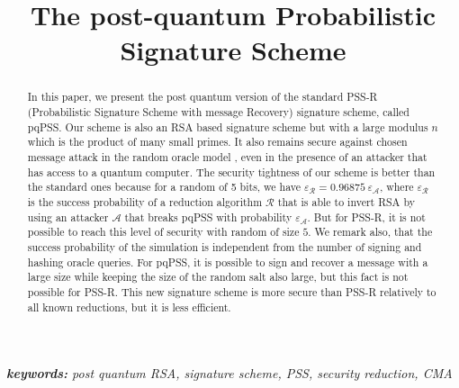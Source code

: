 \documentclass[a4paper,11pt]{article}
\begin{document}
\title{The post-quantum Probabilistic Signature Scheme}
\maketitle
\begin{abstract}
In this paper, we present the post quantum version of the standard PSS-R (Probabilistic Signature Scheme with message Recovery) signature scheme, called pqPSS. Our scheme is also an RSA based signature scheme but with a large modulus $n$ which is the product of many small primes. It also remains secure against chosen message attack in the random oracle model , even in the presence of an attacker that has access to a quantum computer. The security tightness of our scheme is better than the standard ones because for a random of 5 bits, we have $\varepsilon_{\mathcal{R}}=0.96875 \ \varepsilon_{\mathcal{A}}$, where $\varepsilon_{\mathcal{R}}$  is the success probability of a reduction algorithm $\mathcal{R}$ that is able to invert RSA by using an attacker $\mathcal{A}$ that breaks pqPSS with probability $\varepsilon_{\mathcal{A}}$. But for PSS-R, it is not possible to reach this level of security with random of size $5$. We remark also, that the success probability of the simulation is independent from the number of signing and hashing oracle queries. For pqPSS, it is possible to sign and recover a message with a large size while keeping the size of the random salt also large, but this fact is not possible for PSS-R. This new signature scheme is more secure than PSS-R relatively to all known reductions, but it is less efficient.
\end{abstract}
{\it \textbf{keywords:} post quantum RSA, signature scheme, PSS, security reduction, CMA}
\end{document}
